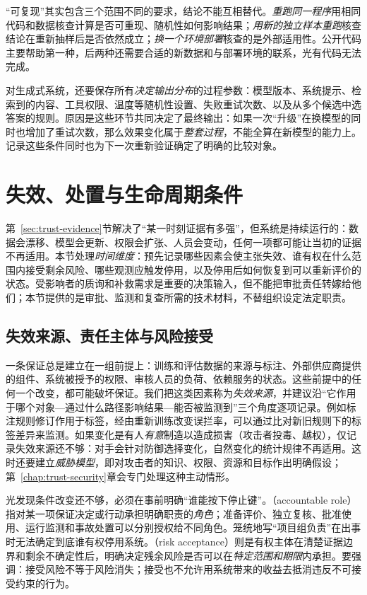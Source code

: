 “可复现”其实包含三个范围不同的要求，结论不能互相替代。\emph{重跑同一程序}用相同代码和数据核查计算是否可重现、随机性如何影响结果；\emph{用新的独立样本重跑}核查结论在重新抽样后是否依然成立；\emph{换一个环境部署}核查的是外部适用性。公开代码主要帮助第一种，后两种还需要合适的新数据和与部署环境的联系，光有代码无法完成。

对生成式系统，还要保存所有\emph{决定输出分布}的过程参数：模型版本、系统提示、检索到的内容、工具权限、温度等随机性设置、失败重试次数、以及从多个候选中选答案的规则。原因是这些环节共同决定了最终输出：如果一次“升级”在换模型的同时也增加了重试次数，那么效果变化属于\emph{整套过程}，不能全算在新模型的能力上。记录这些条件同时也为下一次重新验证确定了明确的比较对象。

\section{失效、处置与生命周期条件}
\label{sec:trust-lifecycle}

第~\ref{sec:trust-evidence}节解决了“某一时刻证据有多强”，但系统是持续运行的：数据会漂移、模型会更新、权限会扩张、人员会变动，任何一项都可能让当初的证据不再适用。本节处理\emph{时间维度}：预先记录哪些因素会使主张失效、谁有权在什么范围内接受剩余风险、哪些观测应触发停用，以及停用后如何恢复到可以重新评价的状态。受影响者的质询和补救需求是重要的决策输入，但不能把审批责任转嫁给他们；本节提供的是审批、监测和复查所需的技术材料，不替组织设定法定职责。

\subsection{失效来源、责任主体与风险接受}

一条保证总是建立在一组前提上：训练和评估数据的来源与标注、外部供应商提供的组件、系统被授予的权限、审核人员的负荷、依赖服务的状态。这些前提中的任何一个改变，都可能破坏保证。我们把这类因素称为\emph{失效来源}，并建议沿“它作用于哪个对象—通过什么路径影响结果—能否被监测到”三个角度逐项记录。例如标注规则修订作用于标签，经由重新训练改变误拦率，可以通过比对新旧规则下的标签差异来监测。如果变化是有人\emph{有意}制造以造成损害（攻击者投毒、越权），仅记录失效来源还不够：对手会针对防御选择变化，自然变化的统计规律不再适用。这时还要建立\emph{威胁模型}，即对攻击者的知识、权限、资源和目标作出明确假设；第~\ref{chap:trust-security}章会专门处理这种主动情形。

光发现条件改变还不够，必须在事前明确“谁能按下停止键”。（accountable role）指对某一项保证决定或行动承担明确职责的\emph{角色}；准备评价、独立复核、批准使用、运行监测和事故处置可以分别授权给不同角色。笼统地写“项目组负责”在出事时无法确定到底谁有权停用系统。（risk acceptance）则是有权主体在清楚证据边界和剩余不确定性后，明确决定残余风险是否可以在\emph{特定范围和期限}内承担。要强调：接受风险不等于风险消失；接受也不允许用系统带来的收益去抵消违反不可接受约束的行为。

